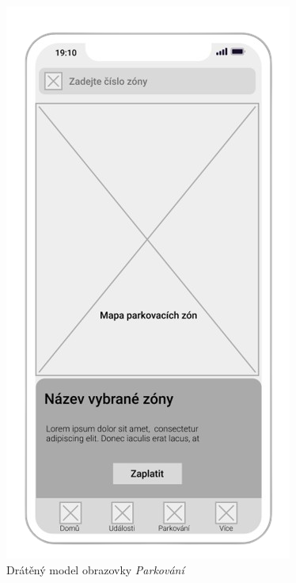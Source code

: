 \hfill
\begin{minipage}[t]{0.45\textwidth}
  \begin{figure}[H]
    \centering
    \includegraphics[width=.7\textwidth]{parking_wireframe.png}
    \caption{Drátěný model obrazovky \textit{Parkování}}
    \label{fig:wireframe3}
  \end{figure}
  \begin{figure}[H]
    \centering

\end{figure}
\end{minipage}
